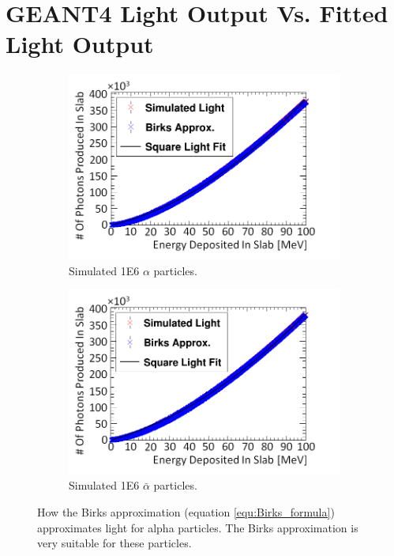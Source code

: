 
\chapter{GEANT4 Light Output Vs. Fitted Light Output}

\begin{figure}[htbp]
\centering
\begin{subfigure}{.49\textwidth}
  \centering
  \includegraphics[width=\linewidth]{Appendix5/newNewFigs/alphaBirksSlab_simAndApproxLight.png}
  \captionsetup{width=.9\linewidth}
  \caption{Simulated 1E6 $\alpha$ particles.}
  \label{subfig:append5_light_of_Alphas0-100mev}
\end{subfigure}
\begin{subfigure}{.49\textwidth}
  \centering
  \includegraphics[width=\linewidth]{Appendix5/newNewFigs/aAlphaBirksSlab_simAndApproxLight.png}
  \captionsetup{width=.9\linewidth}
  \caption{Simulated 1E6 $\bar{\alpha}$ particles.}
  \label{subfig:append5_light_of_AAlphas0-100mev}
\end{subfigure}
\caption{How the Birks approximation (equation \ref{equ:Birks_formula}) approximates light for alpha particles. The Birks approximation is very suitable for these particles.}
\label{fig:append5_light_of_Alphas_AAlphas0-100mev}
\end{figure}

